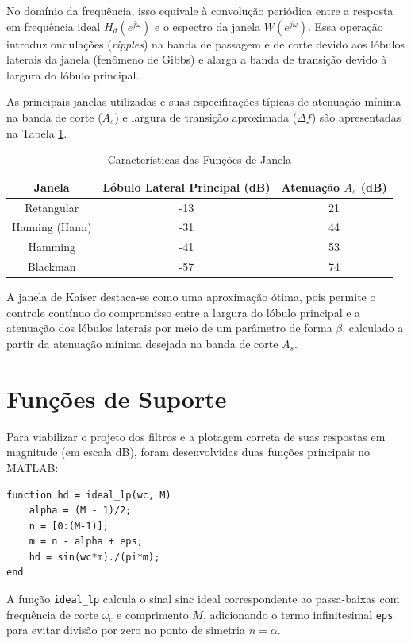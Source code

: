 \documentclass[10pt, conference]{IEEEtran}
\begin{document}
No domínio da frequência, isso equivale à convolução periódica entre a resposta em frequência ideal $H_d(e^{j\omega})$ e o espectro da janela $W(e^{j\omega})$. Essa operação introduz ondulações (\textit{ripples}) na banda de passagem e de corte devido aos lóbulos laterais da janela (fenômeno de Gibbs) e alarga a banda de transição devido à largura do lóbulo principal.

As principais janelas utilizadas e suas especificações típicas de atenuação mínima na banda de corte ($A_s$) e largura de transição aproximada ($\Delta f$) são apresentadas na Tabela \ref{tab:janelas_teoricas}.

\begin{table}[H]
\centering
\caption{Características das Funções de Janela}
\label{tab:janelas_teoricas}
\begin{tabular}{ccc}
\toprule
\textbf{Janela} & \textbf{Lóbulo Lateral Principal (dB)} & \textbf{Atenuação $A_s$ (dB)} \\ \midrule
Retangular & -13 & 21 \\
Hanning (Hann) & -31 & 44 \\
Hamming & -41 & 53 \\
Blackman & -57 & 74 \\ \bottomrule
\end{tabular}
\end{table}

A janela de Kaiser destaca-se como uma aproximação ótima, pois permite o controle contínuo do compromisso entre a largura do lóbulo principal e a atenuação dos lóbulos laterais por meio de um parâmetro de forma $\beta$, calculado a partir da atenuação mínima desejada na banda de corte $A_s$.

\section{Funções de Suporte}
Para viabilizar o projeto dos filtros e a plotagem correta de suas respostas em magnitude (em escala dB), foram desenvolvidas duas funções principais no MATLAB:

\begin{lstlisting}[caption={Função para resposta ao impulso ideal de um filtro passa-baixas.}]
function hd = ideal_lp(wc, M)
    alpha = (M - 1)/2;
    n = [0:(M-1)];
    m = n - alpha + eps; 
    hd = sin(wc*m)./(pi*m);
end
\end{lstlisting}

A função \texttt{ideal\_lp} calcula o sinal sinc ideal correspondente ao passa-baixas com frequência de corte $\omega_c$ e comprimento $M$, adicionando o termo infinitesimal \texttt{eps} para evitar divisão por zero no ponto de simetria $n = \alpha$.
\end{document}
